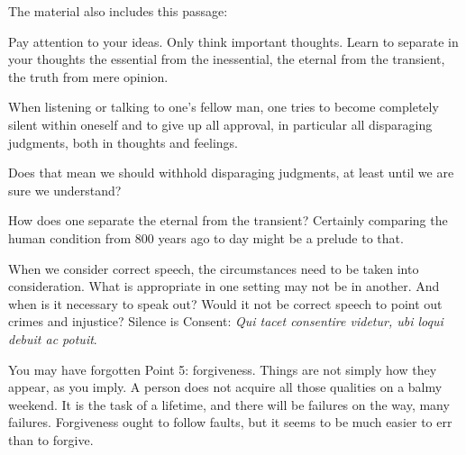 \begin{footnotesize}
\begin{sffamily}
The material also includes this passage:

\begin{quotex}
Pay attention to your ideas. Only think important thoughts. Learn to separate in your thoughts the essential from the inessential, the eternal from the transient, the truth from mere opinion.

When listening or talking to one's fellow man, one tries to become completely silent within oneself and to give up all approval, in particular all disparaging judgments, both in thoughts and feelings. 

\end{quotex}
Does that mean we should withhold disparaging judgments, at least until we are sure we understand?

How does one separate the eternal from the transient? Certainly comparing the human condition from 800 years ago to day might be a prelude to that.

When we consider correct speech, the circumstances need to be taken into consideration. What is appropriate in one setting may not be in another. And when is it necessary to speak out? Would it not be correct speech to point out crimes and injustice? Silence is Consent: \textit{Qui tacet consentire videtur, ubi loqui debuit ac potuit}.

You may have forgotten Point 5: forgiveness. Things are not simply how they appear, as you imply. A person does not acquire all those qualities on a balmy weekend. It is the task of a lifetime, and there will be failures on the way, many failures. Forgiveness ought to follow faults, but it seems to be much easier to err than to forgive.


\end{sffamily}\end{footnotesize}
